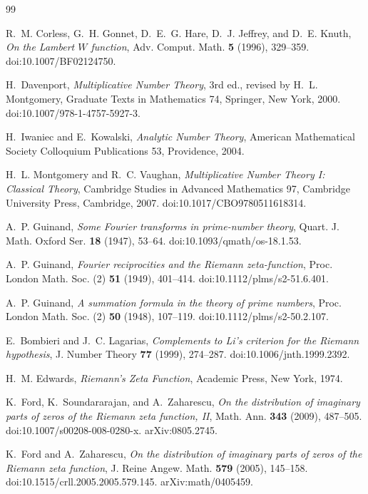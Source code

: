 \documentclass[11pt]{amsart}
\numberwithin{equation}{section}
\theoremstyle{plain}
\theoremstyle{definition}
\theoremstyle{remark}
\newcommand{\1}{\mathbf{1}}
\begin{document}
\begin{thebibliography}{99}

R.~M. Corless, G.~H. Gonnet, D.~E.~G. Hare, D.~J. Jeffrey, and D.~E. Knuth,
\emph{On the Lambert \(W\) function},
Adv. Comput. Math. \textbf{5} (1996), 329--359.
doi:10.1007/BF02124750.



H.~Davenport,
\emph{Multiplicative Number Theory},
3rd ed., revised by H.~L. Montgomery,
Graduate Texts in Mathematics 74, Springer, New York, 2000.
doi:10.1007/978-1-4757-5927-3.

H.~Iwaniec and E.~Kowalski,
\emph{Analytic Number Theory},
American Mathematical Society Colloquium Publications 53,
Providence, 2004.

H.~L. Montgomery and R.~C. Vaughan,
\emph{Multiplicative Number Theory I: Classical Theory},
Cambridge Studies in Advanced Mathematics 97,
Cambridge University Press, Cambridge, 2007.
doi:10.1017/CBO9780511618314.



A.~P. Guinand,
\emph{Some Fourier transforms in prime-number theory},
Quart. J. Math. Oxford Ser. \textbf{18} (1947), 53--64.
doi:10.1093/qmath/os-18.1.53.

A.~P. Guinand,
\emph{Fourier reciprocities and the Riemann zeta-function},
Proc. London Math. Soc. (2) \textbf{51} (1949), 401--414.
doi:10.1112/plms/s2-51.6.401.

A.~P. Guinand,
\emph{A summation formula in the theory of prime numbers},
Proc. London Math. Soc. (2) \textbf{50} (1948), 107--119.
doi:10.1112/plms/s2-50.2.107.

E.~Bombieri and J.~C. Lagarias,
\emph{Complements to Li's criterion for the Riemann hypothesis},
J. Number Theory \textbf{77} (1999), 274--287.
doi:10.1006/jnth.1999.2392.

H.~M. Edwards,
\emph{Riemann's Zeta Function},
Academic Press, New York, 1974.

K.~Ford, K.~Soundararajan, and A.~Zaharescu,
\emph{On the distribution of imaginary parts of zeros of the Riemann
zeta function, II},
Math. Ann. \textbf{343} (2009), 487--505.
doi:10.1007/s00208-008-0280-x.
arXiv:0805.2745.

K.~Ford and A.~Zaharescu,
\emph{On the distribution of imaginary parts of zeros of the Riemann
zeta function},
J. Reine Angew. Math. \textbf{579} (2005), 145--158.
doi:10.1515/crll.2005.2005.579.145.
arXiv:math/0405459.


\end{thebibliography}
\end{document}
